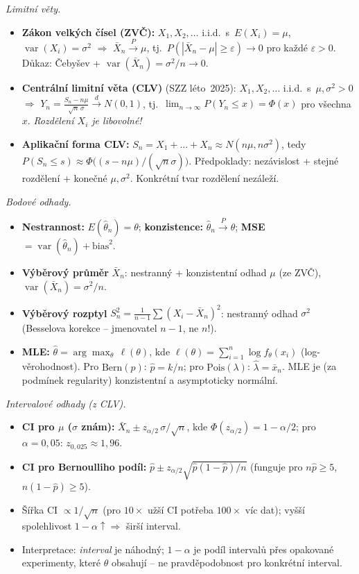 \documentclass[11pt,a4paper]{article}
\DeclareMathOperator{\Var}{var}
\begin{document}
\begin{poznamka}
\smallskip
\emph{Limitní věty.}
\begin{itemize}
  \item \textbf{Zákon velkých čísel (ZVČ):} $X_1,X_2,\dots$ i.i.d.\ s~$E(X_i)=\mu$, $\Var(X_i)=\sigma^2$ $\Rightarrow$ $\bar X_n\xrightarrow{P}\mu$, tj.\ $P(|\bar X_n-\mu|\ge\varepsilon)\to 0$ pro každé $\varepsilon>0$. Důkaz: Čebyšev + $\Var(\bar X_n)=\sigma^2/n\to 0$.
  \item \textbf{Centrální limitní věta (CLV)} (SZZ léto~2025): $X_1,X_2,\dots$ i.i.d.\ s~$\mu,\sigma^2>0$ $\Rightarrow$ $Y_n=\frac{S_n-n\mu}{\sqrt{n}\,\sigma}\xrightarrow{d}N(0,1)$, tj.\ $\lim_{n\to\infty}P(Y_n\le x)=\Phi(x)$ pro všechna $x$. \emph{Rozdělení $X_i$ je libovolné!}
  \item \textbf{Aplikační forma CLV:} $S_n=X_1+\dots+X_n\approx N(n\mu,n\sigma^2)$, tedy $P(S_n\le s)\approx\Phi\bigl((s-n\mu)/(\sqrt{n}\sigma)\bigr)$. Předpoklady: nezávislost + stejné rozdělení + konečné $\mu,\sigma^2$. Konkrétní tvar rozdělení nezáleží.
\end{itemize}

\smallskip
\emph{Bodové odhady.}
\begin{itemize}
  \item \textbf{Nestrannost:} $E(\hat\theta_n)=\theta$; \textbf{konzistence:} $\hat\theta_n\xrightarrow{P}\theta$; \textbf{MSE} $=\Var(\hat\theta_n)+\mathrm{bias}^2$.
  \item \textbf{Výběrový průměr} $\bar X_n$: nestranný + konzistentní odhad $\mu$ (ze ZVČ), $\Var(\bar X_n)=\sigma^2/n$.
  \item \textbf{Výběrový rozptyl} $S_n^2=\tfrac{1}{n-1}\sum(X_i-\bar X_n)^2$: nestranný odhad $\sigma^2$ (Besselova korekce -- jmenovatel $n-1$, ne $n$!).
  \item \textbf{MLE:} $\hat\theta=\arg\max_\theta\,\ell(\theta)$, kde $\ell(\theta)=\sum_{i=1}^n\log f_\theta(x_i)$ (log-věrohodnost). Pro $\mathrm{Bern}(p)$: $\hat p=k/n$; pro $\mathrm{Pois}(\lambda)$: $\hat\lambda=\bar x_n$. MLE je (za podmínek regularity) konzistentní a asymptoticky normální.
\end{itemize}

\smallskip
\emph{Intervalové odhady (z CLV).}
\begin{itemize}
  \item \textbf{CI pro $\mu$ ($\sigma$ znám):} $\bar X_n\pm z_{\alpha/2}\,\sigma/\sqrt{n}$, kde $\Phi(z_{\alpha/2})=1-\alpha/2$; pro $\alpha=0{,}05$: $z_{0{,}025}\approx 1{,}96$.
  \item \textbf{CI pro Bernoulliho podíl:} $\hat p\pm z_{\alpha/2}\sqrt{\hat p(1-\hat p)/n}$ (funguje pro $n\hat p\ge 5$, $n(1-\hat p)\ge 5$).
  \item Šířka CI $\propto 1/\sqrt{n}$ (pro $10\times$ užší CI potřeba $100\times$ víc dat); vyšší spolehlivost $1-\alpha\uparrow\Rightarrow$ širší interval.
  \item Interpretace: \emph{interval} je náhodný; $1-\alpha$ je podíl intervalů přes opakované experimenty, které $\theta$ obsahují -- ne pravděpodobnost pro konkrétní interval.
\end{itemize}


\end{poznamka}
\end{document}
